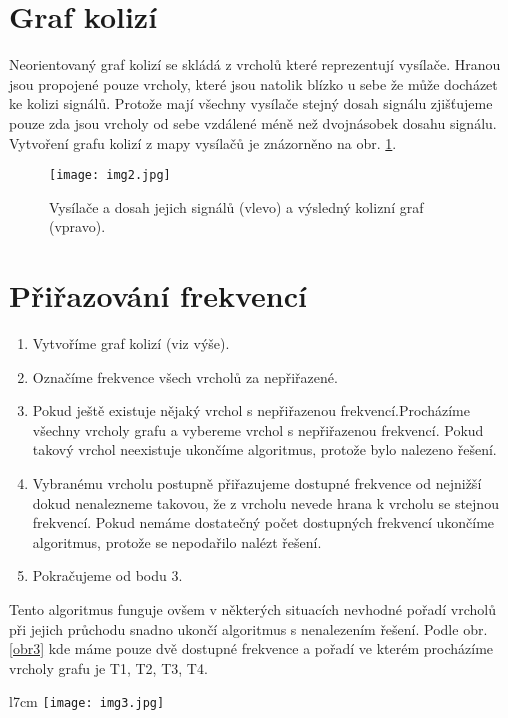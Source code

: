 \documentclass[12pt]{report}
\begin{document}
\section{Graf kolizí} \label{graf_kolizi}
Neorientovaný graf kolizí se skládá z vrcholů které reprezentují vysílače. Hranou jsou propojené pouze vrcholy, které jsou natolik blízko u sebe že může docházet ke kolizi signálů. Protože mají všechny vysílače stejný dosah signálu zjišťujeme pouze zda jsou vrcholy od sebe vzdálené méně než dvojnásobek dosahu signálu. Vytvoření grafu kolizí z mapy vysílačů je znázorněno na obr. \ref{obr2}.

\begin{figure}[h]
\texttt{[image: img2.jpg]}
\caption{Vysílače a dosah jejich signálů (vlevo) a výsledný kolizní graf (vpravo).
\label{obr2}}
\end{figure}

\pagebreak
\section{Přiřazování frekvencí} \label{prirazovani_frekvenci}
\begin{enumerate}
\item Vytvoříme graf kolizí (viz výše).
\item Označíme frekvence všech vrcholů za nepřiřazené.
\item Pokud ještě existuje nějaký vrchol s nepřiřazenou frekvencí.Procházíme všechny vrcholy grafu a vybereme vrchol s nepřiřazenou frekvencí. Pokud takový vrchol neexistuje ukončíme algoritmus, protože bylo nalezeno řešení.
\item Vybranému vrcholu postupně přiřazujeme dostupné frekvence od nejnižší dokud nenalezneme takovou, že z vrcholu nevede hrana k vrcholu se stejnou frekvencí. Pokud nemáme dostatečný počet dostupných frekvencí ukončíme algoritmus, protože se nepodařilo nalézt řešení.
\item Pokračujeme od bodu 3.
\end{enumerate}

Tento algoritmus funguje ovšem v některých situacích nevhodné pořadí vrcholů při jejich průchodu snadno ukončí algoritmus s nenalezením řešení. Podle obr. \ref{obr3} kde máme pouze dvě dostupné frekvence a pořadí ve kterém procházíme vrcholy grafu je T1, T2, T3, T4.

\begin{wrapfigure}[11]{l}{7cm}
\texttt{[image: img3.jpg]}
\caption{Přiřazování frekvencí.}
\label{obr3}
\end{wrapfigure}
\end{document}
